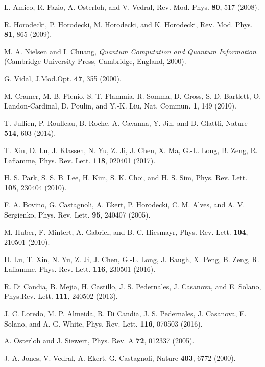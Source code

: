 \documentclass[10pt,nofootinbib,notitlepage,twocolumn,superscriptaddress]{revtex4-1}
\theoremstyle{plain}
\theoremstyle{definition}
\begin{document}
\begin{thebibliography}{99}

 L. Amico, R. Fazio, A. Osterloh, and V. Vedral, Rev. Mod. Phys.  {\bf 80}, 517 (2008).

 R. Horodecki, P. Horodecki, M. Horodecki, and K. Horodecki, Rev. Mod. Phys.  {\bf 81}, 865 (2009).

 M. A. Nielsen and I. Chuang, {\it Quantum Computation and Quantum Information} (Cambridge University Press, Cambridge, England, 2000).

 G. Vidal, J.Mod.Opt. {\bf 47}, 355 (2000).

 M. Cramer, M. B. Plenio, S. T. Flammia, R. Somma, D. Gross, S. D. Bartlett, O. Landon-Cardinal, D. Poulin, and Y.-K. Liu, Nat. Commun.  {\bf 1}, 149 (2010).

 T. Jullien, P. Roulleau, B. Roche, A. Cavanna, Y. Jin, and D. Glattli, Nature  {\bf 514}, 603 (2014).

 T. Xin, D. Lu, J. Klassen, N. Yu, Z. Ji, J. Chen, X. Ma, G.-L. Long, B. Zeng, R. Laflamme, Phys. Rev. Lett. {\bf 118}, 020401 (2017).

 H. S. Park, S. S. B. Lee, H. Kim, S. K. Choi, and H. S. Sim, Phys. Rev. Lett. {\bf 105}, 230404 (2010).

 F. A. Bovino, G. Castagnoli, A. Ekert, P. Horodecki, C. M. Alves, and A. V. Sergienko, Phys. Rev. Lett. {\bf 95}, 240407 (2005).

 M. Huber, F. Mintert, A. Gabriel, and B. C. Hiesmayr, Phys. Rev. Lett. {\bf 104}, 210501 (2010).

 D. Lu, T. Xin, N. Yu, Z. Ji, J. Chen, G.-L. Long, J. Baugh, X. Peng, B. Zeng, R. Laflamme, Phys. Rev. Lett. {\bf 116}, 230501 (2016).

 R. Di Candia, B. Mejia, H. Castillo, J. S. Pedernales, J. Casanova, and E. Solano, Phys.Rev. Lett. {\bf 111}, 240502 (2013).

 J. C. Loredo, M. P. Almeida, R. Di Candia, J. S. Pedernales, J. Casanova, E. Solano, and A. G. White, Phys. Rev. Lett. {\bf 116},  070503 (2016).

 A. Osterloh and J. Siewert, Phys. Rev. A {\bf 72}, 012337 (2005).

 J. A. Jones, V. Vedral, A. Ekert, G. Castagnoli, Nature  {\bf 403}, 6772 (2000).


\end{thebibliography}
\end{document}
